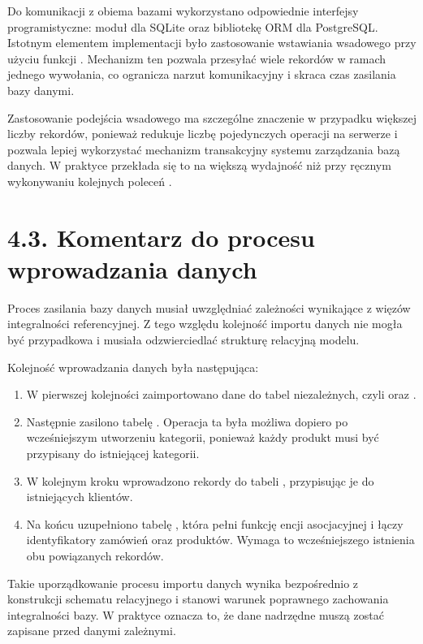\documentclass[letterpaper,10pt,polish]{sphinxmanual}
\begin{document}
\sphinxAtStartPar
Do komunikacji z obiema bazami wykorzystano odpowiednie interfejsy programistyczne: moduł  dla SQLite oraz bibliotekę ORM  dla PostgreSQL. Istotnym elementem implementacji było zastosowanie wstawiania wsadowego przy użyciu funkcji . Mechanizm ten pozwala przesyłać wiele rekordów w ramach jednego wywołania, co ogranicza narzut komunikacyjny i skraca czas zasilania bazy danymi.

\sphinxAtStartPar
Zastosowanie podejścia wsadowego ma szczególne znaczenie w przypadku większej liczby rekordów, ponieważ redukuje liczbę pojedynczych operacji na serwerze i pozwala lepiej wykorzystać mechanizm transakcyjny systemu zarządzania bazą danych. W praktyce przekłada się to na większą wydajność niż przy ręcznym wykonywaniu kolejnych poleceń .


\section{4.3. Komentarz do procesu wprowadzania danych}
\label{\detokenize{rozdzial_4/index:komentarz-do-procesu-wprowadzania-danych}}
\sphinxAtStartPar
Proces zasilania bazy danych musiał uwzględniać zależności wynikające z więzów integralności referencyjnej. Z tego względu kolejność importu danych nie mogła być przypadkowa i musiała odzwierciedlać strukturę relacyjną modelu.

\sphinxAtStartPar
Kolejność wprowadzania danych była następująca:
\begin{enumerate}
%
\item {} 
\sphinxAtStartPar
W pierwszej kolejności zaimportowano dane do tabel niezależnych, czyli  oraz .

\item {} 
\sphinxAtStartPar
Następnie zasilono tabelę . Operacja ta była możliwa dopiero po wcześniejszym utworzeniu kategorii, ponieważ każdy produkt musi być przypisany do istniejącej kategorii.

\item {} 
\sphinxAtStartPar
W kolejnym kroku wprowadzono rekordy do tabeli , przypisując je do istniejących klientów.

\item {} 
\sphinxAtStartPar
Na końcu uzupełniono tabelę , która pełni funkcję encji asocjacyjnej i łączy identyfikatory zamówień oraz produktów. Wymaga to wcześniejszego istnienia obu powiązanych rekordów.

\end{enumerate}

\sphinxAtStartPar
Takie uporządkowanie procesu importu danych wynika bezpośrednio z konstrukcji schematu relacyjnego i stanowi warunek poprawnego zachowania integralności bazy. W praktyce oznacza to, że dane nadrzędne muszą zostać zapisane przed danymi zależnymi.



\renewcommand{\indexname}{Indeks}
\printindex
\end{document}
